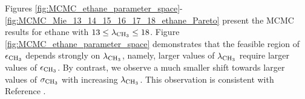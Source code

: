 \documentclass[preprint,letterpaper,floatfix,citeautoscript,aip,jcp]{revtex4-1}
\begin{document}
%
%
%

Figures \ref{fig:MCMC_ethane_parameter_space}-\ref{fig:MCMC_Mie_13_14_15_16_17_18_ethane_Pareto} present the MCMC results for ethane with $13 \leq \lambda_{\rm CH_3} \leq 18$. Figure \ref{fig:MCMC_ethane_parameter_space} demonstrates that the feasible region of $\epsilon_{\rm CH_3}$ depends strongly on $\lambda_{\rm CH_3}$, namely, larger values of $\lambda_{\rm CH_3}$ require larger values of $\epsilon_{\rm CH_3}$. By contrast, we observe a much smaller shift towards larger values of $\sigma_{\rm CH_3}$ with increasing $\lambda_{\rm CH_3}$. This observation is consistent with Reference .
\end{document}

